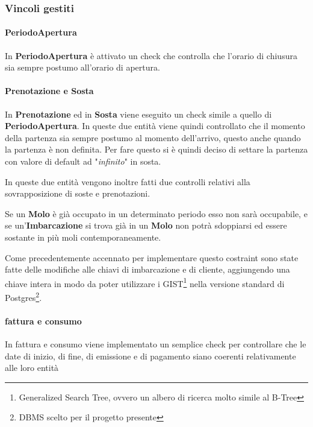 \subsubsection{Vincoli gestiti}\label{vincoli_gestiti}

\paragraph{PeriodoApertura}
In \textbf{PeriodoApertura} è attivato un check che controlla che l'orario di chiusura sia sempre postumo all'orario di apertura.

\paragraph{Prenotazione e Sosta}
In \textbf{Prenotazione} ed in \textbf{Sosta} viene eseguito un check simile a quello di \textbf{PeriodoApertura}. In queste due entità viene quindi controllato che il momento della partenza sia sempre postumo al momento dell'arrivo, questo anche quando la partenza è non definita. Per fare questo si è quindi deciso di settare la partenza con valore di default ad "\textit{infinito}" in sosta.

In queste due entità vengono inoltre fatti due controlli relativi alla sovrapposizione di soste e prenotazioni.

Se un \textbf{Molo} è già occupato in un determinato periodo esso non sarà occupabile, e se un'\textbf{Imbarcazione} si trova già in un \textbf{Molo} non potrà sdoppiarsi ed essere sostante in più moli contemporaneamente.

Come precedentemente accennato per implementare questo costraint sono state fatte delle modifiche alle chiavi di imbarcazione e di cliente, aggiungendo una chiave intera in modo da poter utilizzare i GIST\footnote{Generalized Search Tree, ovvero un albero di ricerca molto simile al B-Tree} nella versione standard di Postgres\footnote{DBMS scelto per il progetto presente}.

\paragraph{fattura e consumo}

In fattura e consumo viene implementato un semplice check per controllare che le date di inizio, di fine, di emissione e di pagamento siano coerenti relativamente alle loro entità
